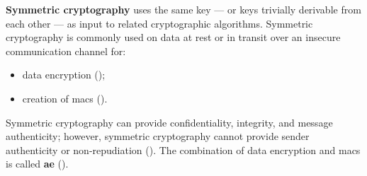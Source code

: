 \textbf{Symmetric cryptography} uses the same key --- or keys trivially derivable from each other --- as input to related cryptographic algorithms. Symmetric cryptography is commonly used on data at rest or in transit over an insecure communication channel for:

\begin{itemize}
	\item data encryption ();
	\item creation of \glspl{mac} ().
\end{itemize}

Symmetric cryptography can provide confidentiality, integrity, and message authenticity; however, symmetric cryptography cannot provide sender authenticity or non-repudiation (). The combination of data encryption and \glspl{mac} is called \textbf{\gls{ae}} ().

